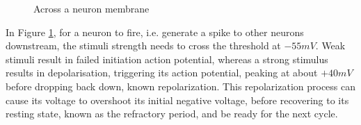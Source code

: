 \begin{figure}[H]
	\centering
	\caption{Across a neuron membrane}
	\label{fig:bioneuron}
\end{figure}

In Figure \ref{fig:bioneuron}, for a neuron to fire, i.e. generate a spike to other neurons downstream, the stimuli strength needs to cross the threshold at $-55mV$. Weak stimuli result in failed initiation action potential, whereas a strong stimulus results in depolarisation, triggering its action potential, peaking at about $+40mV$ before dropping back down, known repolarization. This repolarization process can cause its voltage to overshoot its initial negative voltage, before recovering to its resting state, known as the refractory period, and be ready for the next cycle.

